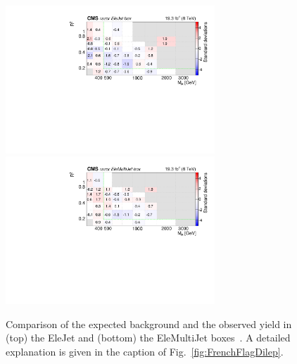 \begin{figure}[tb!]
\end{figure}

\begin{figure}[tb!]
\centering
\includegraphics[width=0.7\textwidth]{figs/analysis8TeV/nSigmaLog_EleJet.pdf}
\includegraphics[width=0.7\textwidth]{figs/analysis8TeV/nSigmaLog_EleMultiJet.pdf}
\caption{Comparison of the expected background and the observed yield
  in (top) the EleJet and (bottom) the EleMultiJet boxes~\cite{razor8TeV,jmgd}. A detailed explanation is given in the caption of
  Fig.~\ref{fig:FrenchFlagDilep}.\label{fig:FrenchFlagEle}}
\end{figure}


